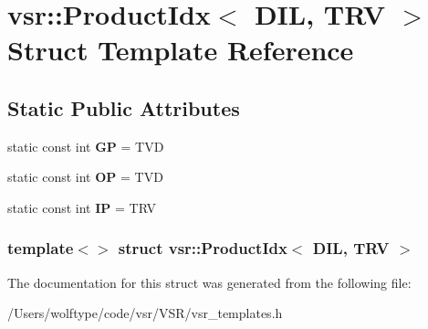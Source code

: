 \hypertarget{structvsr_1_1_product_idx_3_01_d_i_l_00_01_t_r_v_01_4}{\section{vsr\-:\-:Product\-Idx$<$ D\-I\-L, T\-R\-V $>$ Struct Template Reference}
\label{structvsr_1_1_product_idx_3_01_d_i_l_00_01_t_r_v_01_4}
}
\subsection*{Static Public Attributes}
\begin{DoxyCompactItemize}
\item 
\hypertarget{structvsr_1_1_product_idx_3_01_d_i_l_00_01_t_r_v_01_4_a405e9dc0e5c13d14310b779b37ed796c}{static const int {\bfseries G\-P} = T\-V\-D}\label{structvsr_1_1_product_idx_3_01_d_i_l_00_01_t_r_v_01_4_a405e9dc0e5c13d14310b779b37ed796c}

\item 
\hypertarget{structvsr_1_1_product_idx_3_01_d_i_l_00_01_t_r_v_01_4_aa733ddeb5e3bd299366d3666385dac52}{static const int {\bfseries O\-P} = T\-V\-D}\label{structvsr_1_1_product_idx_3_01_d_i_l_00_01_t_r_v_01_4_aa733ddeb5e3bd299366d3666385dac52}

\item 
\hypertarget{structvsr_1_1_product_idx_3_01_d_i_l_00_01_t_r_v_01_4_aebf2b49c3b84d7382a5299ec39501e78}{static const int {\bfseries I\-P} = T\-R\-V}\label{structvsr_1_1_product_idx_3_01_d_i_l_00_01_t_r_v_01_4_aebf2b49c3b84d7382a5299ec39501e78}

\end{DoxyCompactItemize}
\subsubsection*{template$<$$>$ struct vsr\-::\-Product\-Idx$<$ D\-I\-L, T\-R\-V $>$}



The documentation for this struct was generated from the following file\-:\begin{DoxyCompactItemize}
\item 
/\-Users/wolftype/code/vsr/\-V\-S\-R/vsr\-\_\-templates.\-h\end{DoxyCompactItemize}
